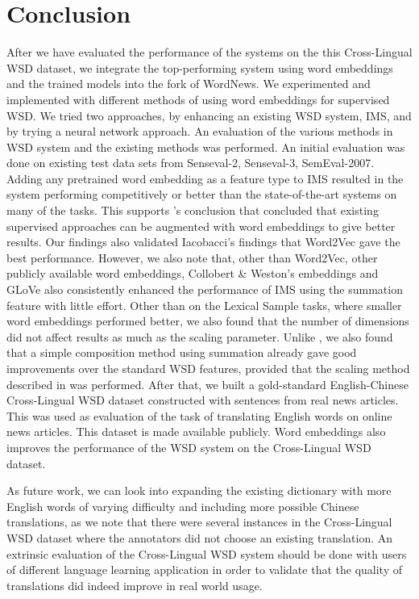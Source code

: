 \section{Conclusion}
\label{section:conclusion}

After we have evaluated the performance of the systems on the this Cross-Lingual WSD dataset, we integrate the top-performing system using word embeddings and the trained models into the fork of WordNews. We experimented and implemented with different methods of using word embeddings for supervised WSD. We tried two approaches, by enhancing an existing WSD system, IMS, and by trying a neural network approach. An evaluation of the various methods in WSD system and the existing methods was performed. An initial evaluation was done on existing test data sets from Senseval-2, Senseval-3, SemEval-2007. Adding any pretrained word embedding as a feature type to IMS resulted in the system performing competitively or better than the state-of-the-art systems on many of the tasks. This supports \cite{Iacobacci2016}'s conclusion that concluded that 
existing supervised approaches can be augmented with word embeddings to give better results. Our findings also validated Iacobacci's findings that Word2Vec gave the best performance. However, we also note that, other than Word2Vec, other publicly available word embeddings, Collobert \& Weston's embeddings and GLoVe also consistently enhanced the performance of IMS using the summation feature with little effort. Other than on the Lexical Sample tasks, where smaller word embeddings performed better, we also found that the number of dimensions did not affect results as much as the scaling parameter. Unlike , we also found that a simple composition method using summation already gave good improvements over the standard WSD features, provided that the scaling method described in \cite{Taghipour15} was performed.
After that, we built a gold-standard English-Chinese Cross-Lingual WSD dataset constructed with sentences from real news articles. This was used as evaluation of the task of translating English words on online news articles. This dataset is made available publicly. Word embeddings also improves the performance of the WSD system on the Cross-Lingual WSD dataset. 

As future work, we can look into expanding the existing dictionary with more English words of varying difficulty and including more possible Chinese translations, as we note that there were several instances in the Cross-Lingual WSD dataset where the annotators did not choose an existing translation. An extrinsic evaluation of the Cross-Lingual WSD system should be done with users of different language learning application in order to validate that the quality of translations did indeed improve in real world usage. 